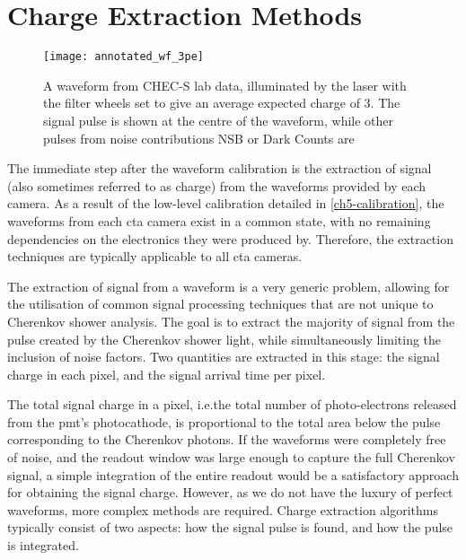 \section{Charge Extraction Methods}

\begin{figure}
	\centering
    \texttt{[image: annotated\_wf\_3pe]} 
	\caption[Annotated waveform.]{A waveform from CHEC-S lab data, illuminated by the laser with the filter wheels set to give an average expected charge of \SI{3}{\pe}. The signal pulse is shown at the centre of the waveform, while other pulses from noise contributions NSB or Dark Counts are }
	\label{fig:annotated_wf_3pe}
\end{figure}

The immediate step after the waveform calibration is the extraction of signal (also sometimes referred to as charge) from the waveforms provided by each camera. As a result of the low-level calibration detailed in \ref{ch5-calibration}, the waveforms from each \gls{cta} camera exist in a common state, with no remaining dependencies on the electronics they were produced by. Therefore, the extraction techniques are typically applicable to all \gls{cta} cameras. 

The extraction of signal from a waveform is a very generic problem, allowing for the utilisation of common signal processing techniques that are not unique to Cherenkov shower analysis. The goal is to extract the majority of signal from the pulse created by the Cherenkov shower light, while simultaneously limiting the inclusion of noise factors. Two quantities are extracted in this stage: the signal charge in each pixel, and the signal arrival time per pixel. 

The total signal charge in a pixel, i.e.\@ the total number of photo-electrons released from the \gls{pmt}'s photocathode, is proportional to the total area below the pulse corresponding to the Cherenkov photons. If the waveforms were completely free of noise, and the readout window was large enough to capture the full Cherenkov signal, a simple integration of the entire readout would be a satisfactory approach for obtaining the signal charge. However, as we do not have the luxury of perfect waveforms, more complex methods are required. Charge extraction algorithms typically consist of two aspects: how the signal pulse is found, and how the pulse is integrated.

